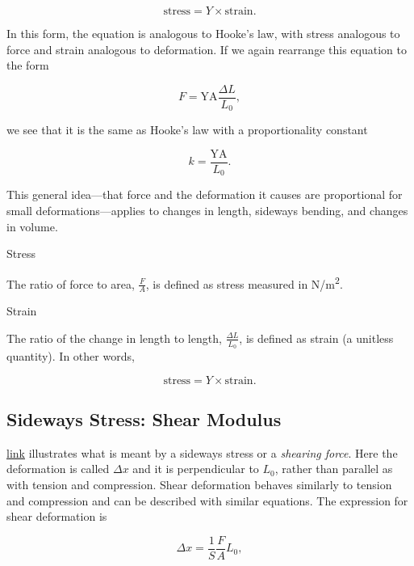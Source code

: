 \documentclass[
]{book}
\begin{document}
\leavevmode{}%
\[{\text{stress} = {Y \times \text{strain}}.}{}\]

In this form, the equation is analogous to Hooke's law, with stress
analogous to force and strain analogous to deformation. If we again
rearrange this equation to the form

\leavevmode{}%
\[{{{F = \text{YA}}\frac{\Delta L}{L_{0}}},}{}\]

we see that it is the same as Hooke's law with a proportionality
constant

\leavevmode{}%
\[{{k = \frac{\text{YA}}{L_{0}}}.}{}\]

This general idea---that force and the deformation it causes are
proportional for small deformations---applies to changes in length,
sideways bending, and changes in volume.

\hypertarget{fs-id1165296614220}{}
Stress

The ratio of force to area, \emph{\(\frac{F}{A}{}\)}, is defined as stress
measured in N/m\textsuperscript{2}.

\hypertarget{fs-id1165298937224}{}
Strain

The ratio of the change in length to length, \(\frac{\Delta L}{L_{0}}{}\),
is defined as strain (a unitless quantity). In other words,

\leavevmode{}%
\[{\text{stress} = {Y \times \text{strain}}.}{}\]

\hypertarget{fs-id1165298648094}{}
\hypertarget{sideways-stress-shear-modulus}{%
\subsection{Sideways Stress: Shear Modulus}\label{sideways-stress-shear-modulus}}

\protect\hyperlink{import-auto-id1165296375245}{link} illustrates
what is meant by a sideways stress or a \emph{shearing force}. Here the
deformation is called \({\Delta x}{}\) and it is perpendicular to
\(L_{0}{}\), rather than parallel as with tension and compression. Shear
deformation behaves similarly to tension and compression and can be
described with similar equations. The expression for \protect\hypertarget{import-auto-id1165296259204}{}{shear
deformation} is

\leavevmode{}%
\[{{\Delta x = \frac{1}{S}}\frac{F}{A}L_{0}}{},\]
\end{document}
